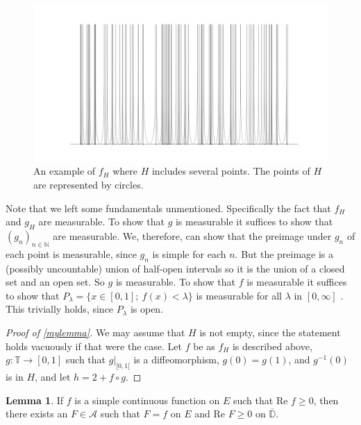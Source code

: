 \documentclass[a4paper,12pt,twoside,BCOR=10mm]{scrbook}
\theoremstyle{definition}
\theoremstyle{definition}
\newtheorem{lemma}[theorem]{Lemma}
\theoremstyle{definition}
\renewcommand{\Re}{\text{Re }}
\begin{document}
\begin{figure}[h]
\centering
\includegraphics[width=1\textwidth]{graph101}
\caption{An example of $f_H$ where $H$ includes several points. The points of $H$ are represented by circles. }
\end{figure}
Note that we left some fundamentals unmentioned.
Specifically the fact that $f_H$ and $g_H$ are measurable.
To show that $g$ is measurable it suffices to show that $(g_n)_{n \in \mathbb{N}}$ are measurable.
We, therefore, can show that the preimage under $g_n$ of each point is measurable, since $g_n$ is simple for each $n$.
But the preimage is a (possibly uncountable) union of half-open intervals so it is the union of a closed set and an open set.
So $g$ is measurable.
To show that $f$ is measurable it suffices to show that $P_{\lambda} = \{x \in [0, 1];\ f(x) < \lambda\}$ is measurable for all $\lambda$ in $[0, \infty]$ \citep[lemma $1.3.9$]{tao}.
This trivially holds, since $P_{\lambda}$ is open.
\begin{proof}[Proof of \ref{mylemma}]
We may assume that $H$ is not empty, since the statement holds vacuously if that were the case.
Let $f$ be as $f_H$ is described above,
	$g: \mathbb{T} \rightarrow [0, 1]$ such that $g|_{[0, 1[}$ is a diffeomorphism, $g(0) = g(1)$, and $g^{-1}(0)$ is in $H$,
	and let $h = 2 + f \circ g$.
\end{proof}
\begin{lemma}
\label{rudinlemma1}
If $f$ is a simple continuous function on $E$ such that $\Re f \geq 0$, then there exists an $F \in \mathcal{A}$ such that $F = f$ on $E$ and $\Re F \geq 0$ on $\overline{\mathbb{D}}$.
\end{lemma}
\end{document}

